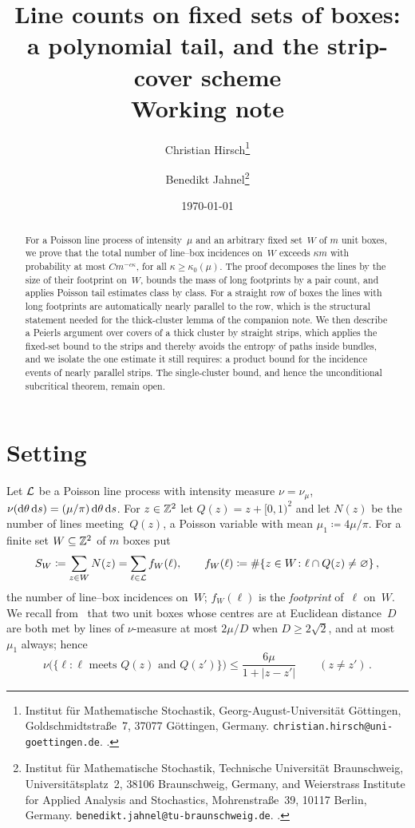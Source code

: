 \documentclass[11pt,letterpaper]{article}
\title{\textbf{Line counts on fixed sets of boxes:\\ a polynomial tail, and the strip-cover scheme}\\[0.6em] \large Working note}
\author{%
  Christian Hirsch\thanks{Institut f\"ur Mathematische Stochastik, Georg-August-Universit\"at G\"ottingen, Goldschmidtstra\ss e~7, 37077 G\"ottingen, Germany. \texttt{christian.hirsch@uni-goettingen.de}. \orcid{0000-0003-4136-3740}.}
  \and
  Benedikt Jahnel\thanks{Institut f\"ur Mathematische Stochastik, Technische Universit\"at Braunschweig, Universit\"atsplatz~2, 38106 Braunschweig, Germany, and Weierstrass Institute for Applied Analysis and Stochastics, Mohrenstra\ss e~39, 10117 Berlin, Germany. \texttt{benedikt.jahnel@tu-braunschweig.de}. \orcid{0000-0002-4212-0065}.}%
}
\date{\today}
\begin{document}
\maketitle
\thispagestyle{plain}

\begin{abstract}
For a Poisson line process of intensity~$\mu$ and an arbitrary fixed set~$W$ of $m$ unit boxes, we prove that the total number of line--box incidences on~$W$ exceeds $\kappa m$ with probability at most $Cm^{-c\kappa}$, for all $\kappa\ge\kappa_0(\mu)$. The proof decomposes the lines by the size of their footprint on~$W$, bounds the mass of long footprints by a pair count, and applies Poisson tail estimates class by class. For a straight row of boxes the lines with long footprints are automatically nearly parallel to the row, which is the structural statement needed for the thick-cluster lemma of the companion note. We then describe a Peierls argument over covers of a thick cluster by straight strips, which applies the fixed-set bound to the strips and thereby avoids the entropy of paths inside bundles, and we isolate the one estimate it still requires: a product bound for the incidence events of nearly parallel strips. The single-cluster bound, and hence the unconditional subcritical theorem, remain open.
\end{abstract}

\section{Setting}
\label{sec:setting}

Let $\mathcal L$ be a Poisson line process with intensity measure $\nu=\nu_\mu$, $\nu(\mathrm{d}\theta\,\mathrm{d} s)=(\mu/\pi)\,\mathrm{d}\theta\,\mathrm{d} s$. For $z\in\mathbb Z^2$ let $Q(z)=z+[0,1)^2$ and let $N(z)$ be the number of lines meeting~$Q(z)$, a Poisson variable with mean $\mu_1\coloneqq4\mu/\pi$. For a finite set $W\subseteq\mathbb Z^2$ of $m$ boxes put
\begin{equation*}
  S_W\coloneqq\sum_{z\in W}N(z)=\sum_{\ell\in\mathcal L}f_W(\ell),\qquad f_W(\ell)\coloneqq\#\{z\in W\colon\ell\cap Q(z)\neq\varnothing\}\,,
\end{equation*}
the number of line--box incidences on~$W$; $f_W(\ell)$ is the \emph{footprint} of~$\ell$ on~$W$. We recall from~\cite[Lemma~3.2]{HJ26b} that two unit boxes whose centres are at Euclidean distance~$D$ are both met by lines of $\nu$-measure at most $2\mu/D$ when $D\ge2\sqrt2$, and at most $\mu_1$ always; hence
\begin{equation}
\label{eq:twobox}
  \nu\bigl(\{\ell\colon\ell\text{ meets }Q(z)\text{ and }Q(z')\}\bigr)\le\frac{6\mu}{1+\lvert z-z'\rvert}\qquad(z\neq z')\,.
\end{equation}
\end{document}

